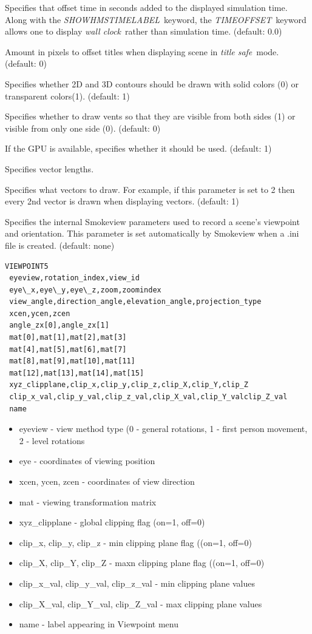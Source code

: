 \documentclass[11pt,twoside]{book}
\newcommand{\hitem}[1]{\item[{\bf #1} \hfill]}
\begin{document}
\hitem{TIMEOFFSET} Specifies that offset time in seconds added to
the displayed simulation time.  Along with the {\em
SHOWHMSTIMELABEL}\ keyword, the {\em TIMEOFFSET}\ keyword allows
one to display {\em wall clock}\ rather than simulation time.
(default: 0.0)

\hitem{TITLESAFE}Amount in pixels to offset titles when displaying
scene in {\em title safe}\ mode.   (default: 0)

\hitem{TRANSPARENT}Specifies whether 2D and 3D contours should be
drawn with solid colors (0) or transparent colors(1). (default: 1)

\hitem{TWOSIDEDVENTS}  Specifies whether to draw vents so that they are visible from
both sides (1) or visible from only one side (0).  (default: 0)

\hitem{USEGPU} If the GPU is available, specifies whether it should be used. (default: 1)


\hitem{VECLENGTH} Specifies vector lengths.

\hitem{VECTORSKIP}Specifies
what vectors to draw.  For example, if this parameter is set to 2 then
every 2nd vector is drawn when displaying vectors.
(default: 1)

\hitem{VIEWPOINT5}Specifies the internal Smokeview parameters used
to record a scene's viewpoint and orientation.  This parameter is
set automatically by Smokeview when a .ini file is created.
(default: none)

{\small
\begin{lstlisting}
VIEWPOINT5
 eyeview,rotation_index,view_id
 eye\_x,eye\_y,eye\_z,zoom,zoomindex
 view_angle,direction_angle,elevation_angle,projection_type
 xcen,ycen,zcen
 angle_zx[0],angle_zx[1]
 mat[0],mat[1],mat[2],mat[3]
 mat[4],mat[5],mat[6],mat[7]
 mat[8],mat[9],mat[10],mat[11]
 mat[12],mat[13],mat[14],mat[15]
 xyz_clipplane,clip_x,clip_y,clip_z,clip_X,clip_Y,clip_Z
 clip_x_val,clip_y_val,clip_z_val,clip_X_val,clip_Y_valclip_Z_val
 name
\end{lstlisting}
}

\begin{itemize}
\item eyeview - view method type (0 - general rotations, 1 - first person movement, 2 - level rotations
\item eye - coordinates of viewing position
\item xcen, ycen, zcen - coordinates of view direction
\item mat - viewing transformation matrix
\item xyz\_clipplane - global clipping flag (on=1, off=0)
\item clip\_x, clip\_y, clip\_z - min clipping plane flag ((on=1, off=0)
\item clip\_X, clip\_Y, clip\_Z - maxn clipping plane flag ((on=1, off=0)
\item clip\_x\_val, clip\_y\_val, clip\_z\_val - min clipping plane values
\item clip\_X\_val, clip\_Y\_val, clip\_Z\_val - max clipping plane values
\item name - label appearing in Viewpoint menu
\end{itemize}
\end{document}
